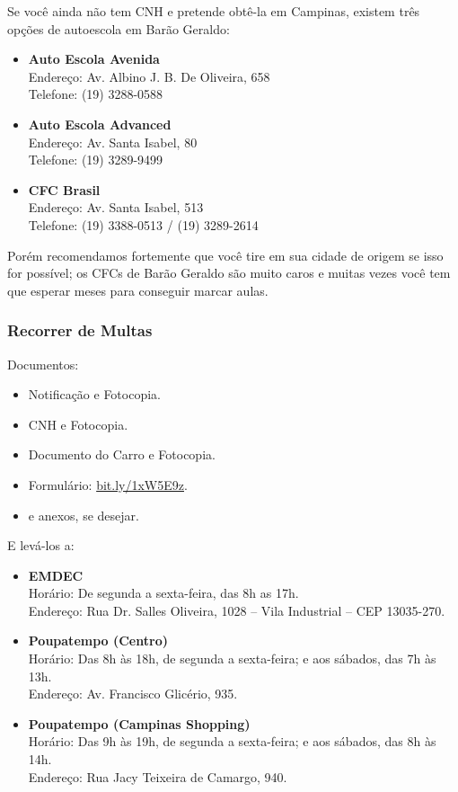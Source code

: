 Se você ainda não tem CNH e pretende obtê-la em Campinas, existem três opções de
autoescola em Barão Geraldo:

\begin{itemize}
    \item \textbf{Auto Escola Avenida} \\Endereço: Av. Albino J. B. De Oliveira,
658 \\Telefone: (19) 3288-0588

    \item \textbf{Auto Escola Advanced} \\Endereço: Av. Santa Isabel, 80
\\Telefone: (19) 3289-9499

    \item \textbf{CFC Brasil} \\Endereço: Av. Santa Isabel, 513
\\Telefone: (19) 3388-0513 / (19) 3289-2614
\end{itemize}

Porém recomendamos fortemente que você tire em sua cidade de origem se isso for
possível; os CFCs de Barão Geraldo são muito caros e muitas vezes você tem que
esperar meses para conseguir marcar aulas.

\subsubsection*{Recorrer de Multas}

Documentos:
\begin{itemize}
    \item Notificação e Fotocopia.
    \item CNH e Fotocopia.
    \item Documento do Carro e Fotocopia.
    \item Formulário:
      \url{bit.ly/1xW5E9z}.
    \item e anexos, se desejar.
\end{itemize}

E levá-los a:
\begin{itemize}
    \item \textbf{EMDEC} \\Horário: De segunda a sexta-feira, das 8h as 17h.
\\Endereço: Rua Dr. Salles Oliveira, 1028 -- Vila Industrial -- CEP 13035-270.
    \item \textbf{Poupatempo (Centro)} \\Horário: Das 8h às 18h, de segunda a
sexta-feira; e aos sábados, das 7h às 13h.  \\Endereço: Av. Francisco Glicério,
935.
    \item \textbf{Poupatempo (Campinas Shopping)} \\Horário: Das 9h às 19h, de
segunda a sexta-feira; e aos sábados, das 8h às 14h.  \\Endereço: Rua Jacy
Teixeira de Camargo, 940.
\end{itemize}

